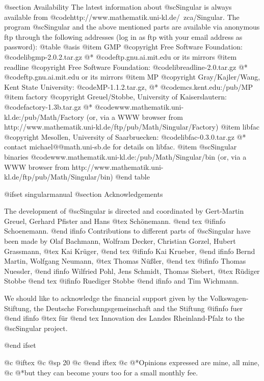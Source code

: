 @section Availability
The latest information about @sc{Singular} is always available from
@code{http://www.mathematik.uni-kl.de/~zca/Singular}.
The program @sc{Singular} and the above mentioned parts are available via
anonymous ftp through the following addresses
(log in as ftp with your email address as password):
@table @asis
@item GMP
@copyright{} Free Software Foundation:
@code{libgmp-2.0.2.tar.gz}
@* @code{ftp.gnu.ai.mit.edu} or its mirrors
@item readline
@copyright{} Free Software Foundation:
@code{libreadline-2.0.tar.gz}
@* @code{ftp.gnu.ai.mit.edu} or its mirrors
@item MP
@copyright{} Gray/Kajler/Wang, Kent State University:
@code{MP-1.1.2.tar.gz},
@* @code{mcs.kent.edu:/pub/MP}
@item factory
@copyright{} Greuel/Stobbe, University of Kaiserslautern:
@code{factory-1.3b.tar.gz}
@* @code{www.mathematik.uni-kl.de:/pub/Math/Factory}
(or, via a WWW browser from http://www.mathematik.uni-kl.de/ftp/pub/Math/Singular/Factory)
@item libfac
@copyright{}  Mesollen, University  of Saarbruecken:
@code{libfac-0.3.0.tar.gz}
@* contact michael@@math.uni-sb.de for details on libfac.
@item @sc{Singular} binaries
@code{www.mathematik.uni-kl.de:/pub/Math/Singular/bin}
(or, via a WWW browser from http://www.mathematik.uni-kl.de/ftp/pub/Math/Singular/bin)
@end table

@ifset singularmanual
@section Acknowledgements

The development of @sc{Singular} is directed and coordinated by
Gert-Martin Greuel, Gerhard Pfister and Hans
@tex
 Sch\"onemann.
@end tex
@ifinfo
 Schoenemann.
@end ifinfo
Contributions to different parts of @sc{Singular} have been made by
Olaf Bachmann,
Wolfram Decker,
Christian Gorzel,
Hubert Grassmann,
@tex
Kai Kr\"uger,
@end tex
@ifinfo
Kai Krueber,
@end ifinfo
Bernd Martin,
Wolfgang Neumann,
@tex
Thomas N\"u{\ss}ler,
@end tex
@ifinfo
Thomas Nuessler,
@end ifinfo
Wilfried Pohl,
Jens Schmidt,
Thomas Siebert,
@tex
R\"udiger Stobbe
@end tex
@ifinfo
Ruediger Stobbe
@end ifinfo
and
Tim Wichmann.

We should like to acknowledge the financial support given by
the Volkswagen-Stiftung,
the Deutsche Forschungsgemeinschaft
and the Stiftung
@ifinfo
fuer
@end ifinfo
@tex
f\"ur
@end tex
 Innovation des Landes Rheinland-Pfalz
to the
@sc{Singular} project.

@end ifset

@c @iftex
@c @sp 20
@c @end iftex
@c @*Opinions expressed are mine,  all mine,
@c @*but they can become yours too for a small monthly fee.
